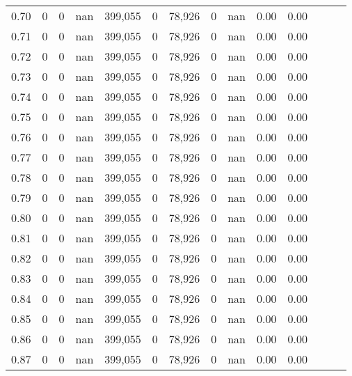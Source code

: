 \begin{tabular}{rrrrrrrrrrrrrr}
0.70 &       0 &       0 &   nan &  399,055 &        0 &  78,926 &       0 &   nan &  0.00 &      0.00 \\
0.71 &       0 &       0 &   nan &  399,055 &        0 &  78,926 &       0 &   nan &  0.00 &      0.00 \\
0.72 &       0 &       0 &   nan &  399,055 &        0 &  78,926 &       0 &   nan &  0.00 &      0.00 \\
0.73 &       0 &       0 &   nan &  399,055 &        0 &  78,926 &       0 &   nan &  0.00 &      0.00 \\
0.74 &       0 &       0 &   nan &  399,055 &        0 &  78,926 &       0 &   nan &  0.00 &      0.00 \\
0.75 &       0 &       0 &   nan &  399,055 &        0 &  78,926 &       0 &   nan &  0.00 &      0.00 \\
0.76 &       0 &       0 &   nan &  399,055 &        0 &  78,926 &       0 &   nan &  0.00 &      0.00 \\
0.77 &       0 &       0 &   nan &  399,055 &        0 &  78,926 &       0 &   nan &  0.00 &      0.00 \\
0.78 &       0 &       0 &   nan &  399,055 &        0 &  78,926 &       0 &   nan &  0.00 &      0.00 \\
0.79 &       0 &       0 &   nan &  399,055 &        0 &  78,926 &       0 &   nan &  0.00 &      0.00 \\
0.80 &       0 &       0 &   nan &  399,055 &        0 &  78,926 &       0 &   nan &  0.00 &      0.00 \\
0.81 &       0 &       0 &   nan &  399,055 &        0 &  78,926 &       0 &   nan &  0.00 &      0.00 \\
0.82 &       0 &       0 &   nan &  399,055 &        0 &  78,926 &       0 &   nan &  0.00 &      0.00 \\
0.83 &       0 &       0 &   nan &  399,055 &        0 &  78,926 &       0 &   nan &  0.00 &      0.00 \\
0.84 &       0 &       0 &   nan &  399,055 &        0 &  78,926 &       0 &   nan &  0.00 &      0.00 \\
0.85 &       0 &       0 &   nan &  399,055 &        0 &  78,926 &       0 &   nan &  0.00 &      0.00 \\
0.86 &       0 &       0 &   nan &  399,055 &        0 &  78,926 &       0 &   nan &  0.00 &      0.00 \\
0.87 &       0 &       0 &   nan &  399,055 &        0 &  78,926 &       0 &   nan &  0.00 &      0.00 \\

\end{tabular}
